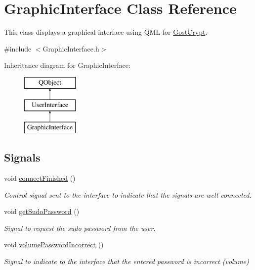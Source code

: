 \hypertarget{class_graphic_interface}{}\section{Graphic\+Interface Class Reference}
\label{class_graphic_interface}


This class displays a graphical interface using Q\+ML for \hyperlink{namespace_gost_crypt}{Gost\+Crypt}.  




{\ttfamily \#include $<$Graphic\+Interface.\+h$>$}

Inheritance diagram for Graphic\+Interface\+:\begin{figure}[H]
\begin{center}
\leavevmode
\includegraphics[height=3.000000cm]{class_graphic_interface}
\end{center}
\end{figure}
\subsection*{Signals}
\begin{DoxyCompactItemize}
\item 
void \hyperlink{class_graphic_interface_aeea1ac14cde1f705f60b9a62735f137c}{connect\+Finished} ()
\begin{DoxyCompactList}\small\item\em Control signal sent to the interface to indicate that the signals are well connected. \end{DoxyCompactList}\item 
void \hyperlink{class_graphic_interface_a528427458ccde6148b32599b1d02a299}{get\+Sudo\+Password} ()
\begin{DoxyCompactList}\small\item\em Signal to request the sudo password from the user. \end{DoxyCompactList}\item 
void \hyperlink{class_graphic_interface_a0fc2d836e15689e5524ed49fdbe93638}{volume\+Password\+Incorrect} ()
\begin{DoxyCompactList}\small\item\em Signal to indicate to the interface that the entered password is incorrect (volume) \end{DoxyCompactList}\end{DoxyCompactItemize}
